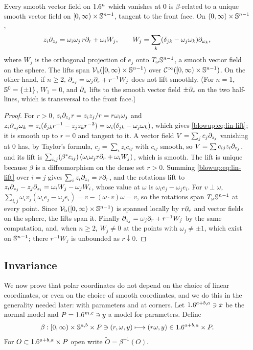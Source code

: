 \begin{lemma}\label{blowup:lem:vf-point}
Every smooth vector field on $1.6^n$ which vanishes at $0$ is $\beta$-related to a unique
smooth vector field on $[0,\infty)\times\mathbb{S}^{n-1}$, tangent to the front face. On
$(0,\infty)\times\mathbb{S}^{n-1}$,
\begin{equation}\label{blowup:eq:lin-lift}
  z_i\partial_{z_j}=\omega_i\omega_j\,r\partial_r+\omega_iW_j,\qquad
  W_j=\sum_k(\delta_{jk}-\omega_j\omega_k)\partial_{\omega_k},
\end{equation}
where $W_j$ is the orthogonal projection of $e_j$ onto $T_\omega\mathbb{S}^{n-1}$, a
smooth vector field on the sphere. The lifts span $\mathcal{V}_{\mathrm{b}}([0,\infty)\times\mathbb{S}^{n-1})$
over $\mathcal{C}^\infty([0,\infty)\times\mathbb{S}^{n-1})$. On the other hand, if $n\ge2$,
$\partial_{z_j}=\omega_j\partial_r+r^{-1}W_j$ does not lift smoothly. \textup{(}For $n=1$,
$\mathbb{S}^0=\{\pm1\}$, $W_1=0$, and $\partial_z$ lifts to the smooth vector field $\pm\partial_r$ on the two
half-lines, which is transversal to the front face.\textup{)}
\end{lemma}
\begin{proof}
For $r>0$, $z_i\partial_{z_j}r=z_iz_j/r=r\omega_i\omega_j$ and
$z_i\partial_{z_j}\omega_k=z_i(\delta_{jk}r^{-1}-z_jz_kr^{-3})=\omega_i(\delta_{jk}-\omega_j\omega_k)$,
which gives \eqref{blowup:eq:lin-lift}; it is smooth up to $r=0$ and tangent to it. A
vector field $V=\sum_jc_j\partial_{z_j}$ vanishing at $0$ has, by Taylor's formula,
$c_j=\sum_iz_ic_{ij}$ with $c_{ij}$ smooth, so $V=\sum c_{ij}z_i\partial_{z_j}$, and its lift
is $\sum_{i,j}(\beta^*c_{ij})\,(\omega_i\omega_jr\partial_r+\omega_iW_j)$, which is smooth. The lift
is unique because $\beta$ is a diffeomorphism on the dense set $r>0$. Summing
\eqref{blowup:eq:lin-lift} over $i=j$ gives $\sum_iz_i\partial_{z_i}=r\partial_r$, and the
rotations lift to $z_i\partial_{z_j}-z_j\partial_{z_i}=\omega_iW_j-\omega_jW_i$, whose value at
$\omega$ is $\omega_ie_j-\omega_je_i$. For $v\perp\omega$,
$\sum_{i,j}\omega_iv_j(\omega_ie_j-\omega_je_i)=v-(\omega\cdot v)\omega=v$, so the rotations
span $T_\omega\mathbb{S}^{n-1}$ at every point. Since $\mathcal{V}_{\mathrm{b}}([0,\infty)\times\mathbb{S}^{n-1})$
is spanned locally by $r\partial_r$ and vector fields on the sphere, the lifts span it.
Finally $\partial_{z_j}=\omega_j\partial_r+r^{-1}W_j$ by the same computation, and, when $n\ge2$,
$W_j\ne0$ at the points with $\omega_j\ne\pm1$, which exist on $\mathbb{S}^{n-1}$; there
$r^{-1}W_j$ is unbounded as $r\downarrow0$.
\end{proof}

\subsection{Invariance}
We now prove that polar coordinates do not depend on the choice of linear coordinates,
or even on the choice of smooth coordinates, and we do this in the generality needed
later: with parameters and at corners. Let $1.6^{a+b,a}\ni x$ be the normal model and
$P=1.6^{m,c}\ni y$ a model for parameters. Define
\begin{equation*}
  \beta:[0,\infty)\times\mathbb{S}^{a,b}\times P\ni(r,\omega,y)\longmapsto(r\omega,y)\in
  1.6^{a+b,a}\times P.
\end{equation*}
For $O\subset1.6^{a+b,a}\times P$ open write $\tilde O=\beta^{-1}(O)$.

